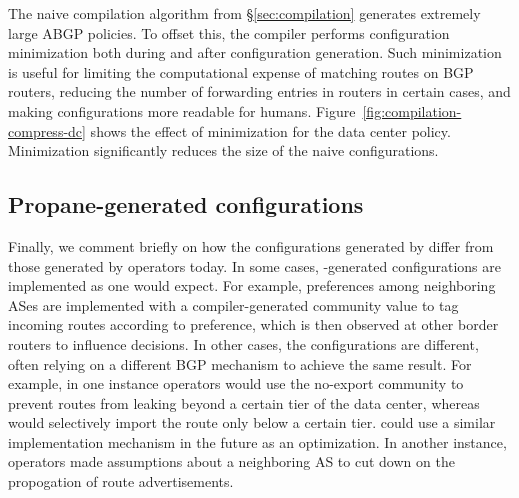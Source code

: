 The naive compilation algorithm from \S\ref{sec:compilation} generates extremely large ABGP policies. To offset this, the compiler performs configuration minimization both during and after configuration generation. Such minimization is useful for limiting the computational expense of matching routes on BGP routers, reducing the number of forwarding entries in routers in certain cases, and making configurations more readable for humans. Figure~\ref{fig:compilation-compress-dc} shows the effect of minimization for the data center policy. Minimization significantly reduces the size of the naive configurations.


\subsection{Propane-generated configurations}

Finally, we comment briefly on how the configurations generated by \sysname differ from those generated by operators today. In some cases, \sysname-generated configurations are implemented as one would expect. For example, preferences among neighboring ASes are implemented with a compiler-generated community value to tag incoming routes according to preference, which is then observed at other border routers to influence decisions. In other cases, the \sysname configurations are different, often relying on a different BGP mechanism to achieve the same result. For example, in one instance operators would use the no-export community to prevent routes from leaking beyond a certain tier of the data center, whereas \sysname would selectively import the route only below a certain tier. \sysname could use a similar implementation mechanism in the future as an optimization. In another instance, operators made assumptions about a neighboring AS to cut down on the propogation of route advertisements.



